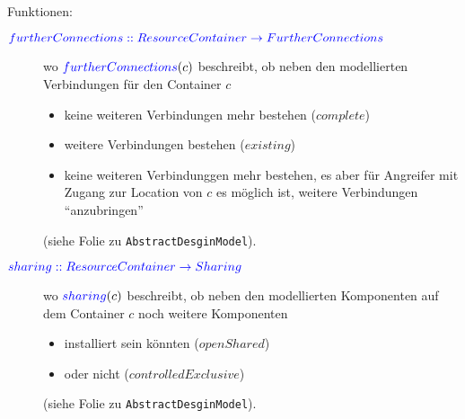 Funktionen:
\begin{description}
  \item[${\color{blue}{furtherConnections :: ResourceContainer \rightarrow FurtherConnections}}$]
        wo ${\color{blue}{furtherConnections}}(c)$ beschreibt, ob neben den modellierten
        Verbindungen für den Container $c$ 
        \begin{itemize}
           \item keine weiteren Verbindungen mehr bestehen ($complete$)
           \item weitere Verbindungen bestehen ($existing$)
           \item keine weiteren Verbindunggen mehr bestehen, 
                 es aber für Angreifer mit Zugang zur Location von $c$ es möglich ist,
                 weitere Verbindungen \enquote{anzubringen}
        \end{itemize} (siehe Folie zu \texttt{AbstractDesginModel}).
  \item[${\color{blue}{sharing :: ResourceContainer \rightarrow Sharing}}$]
        wo ${\color{blue}{sharing}}(c)$ beschreibt, ob neben den modellierten
        Komponenten auf dem Container $c$ noch weitere Komponenten
        \begin{itemize}
           \item installiert sein könnten  ($openShared$)
           \item oder nicht ($controlledExclusive$)
        \end{itemize} (siehe Folie zu \texttt{AbstractDesginModel}).
\end{description} 
